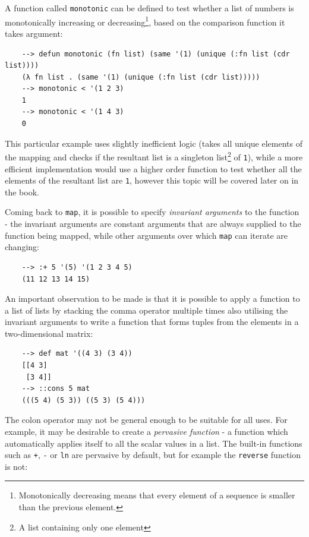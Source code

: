 A function called \verb|monotonic| can be defined to test whether a list of numbers is monotonically increasing or decreasing\footnote{Monotonically decreasing means that every element of a sequence is smaller than the previous element.}, based on the comparison function it takes argument:

\begin{Verbatim}
    --> defun monotonic (fn list) (same '(1) (unique (:fn list (cdr list))))
    (λ fn list . (same '(1) (unique (:fn list (cdr list)))))
    --> monotonic < '(1 2 3)
    1
    --> monotonic < '(1 4 3)
    0
\end{Verbatim}

This particular example uses slightly inefficient logic (takes all unique elements of the mapping and checks if the resultant list is a singleton list\footnote{A list containing only one element} of \verb|1|), while a more efficient implementation would use a higher order function to test whether all the elements of the resultant list are \verb|1|, however this topic will be covered later on in the book.

Coming back to \verb|map|, it is possible to specify \textit{invariant arguments} to the function - the invariant arguments are constant arguments that are always supplied to the function being mapped, while other arguments over which \verb|map| can iterate are changing:

\begin{Verbatim}
    --> :+ 5 '(5) '(1 2 3 4 5)
    (11 12 13 14 15)
\end{Verbatim}

An important observation to be made is that it is possible to apply a function to a list of lists by stacking the comma operator multiple times also utilising the invariant arguments to write a function that forms tuples from the elements in a two-dimensional matrix:

\begin{Verbatim}
    --> def mat '((4 3) (3 4))
    [[4 3]
     [3 4]]
    --> ::cons 5 mat
    (((5 4) (5 3)) ((5 3) (5 4)))
\end{Verbatim}

The colon operator may not be general enough to be suitable for all uses. For example, it may be desirable to create a \textit{pervasive function} - a function which automatically applies itself to all the scalar values in a list. The built-in functions such as \verb|+|, \verb|-| or \verb|ln| are pervasive by default, but for example the \verb|reverse| function is not:

